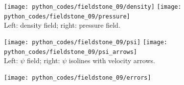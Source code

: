 \begin{center}
\texttt{[image: python\_codes/fieldstone\_09/density]}
\texttt{[image: python\_codes/fieldstone\_09/pressure]}\\
{\small Left: density field; right: pressure field.}
\end{center}

\begin{center}
\texttt{[image: python\_codes/fieldstone\_09/psi]}
\texttt{[image: python\_codes/fieldstone\_09/psi\_arrows]}\\
{\small Left: $\psi$ field; right: $\psi$ isolines with velocity arrows.}
\end{center}

\texttt{[image: python\_codes/fieldstone\_09/errors]}

